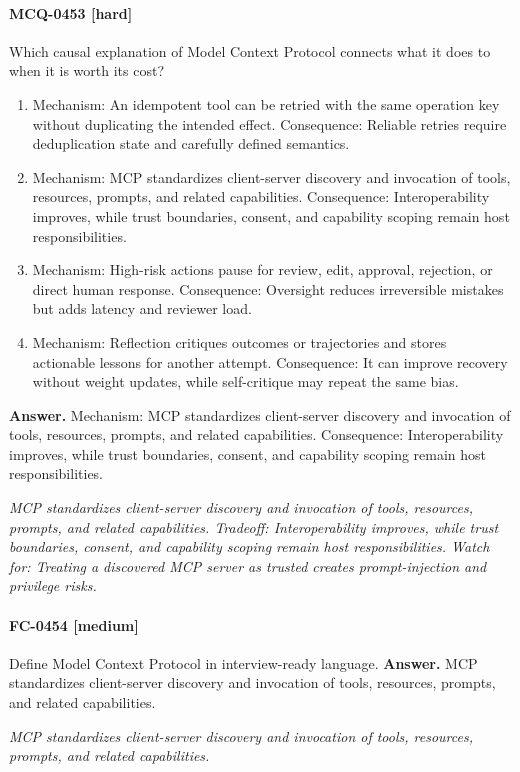 \paragraph{MCQ-0453 [hard]} Which causal explanation of Model Context Protocol connects what it does to when it is worth its cost?
\begin{enumerate}[label=\Alph*.]
\item Mechanism: An idempotent tool can be retried with the same operation key without duplicating the intended effect. Consequence: Reliable retries require deduplication state and carefully defined semantics.
\item Mechanism: MCP standardizes client-server discovery and invocation of tools, resources, prompts, and related capabilities. Consequence: Interoperability improves, while trust boundaries, consent, and capability scoping remain host responsibilities.
\item Mechanism: High-risk actions pause for review, edit, approval, rejection, or direct human response. Consequence: Oversight reduces irreversible mistakes but adds latency and reviewer load.
\item Mechanism: Reflection critiques outcomes or trajectories and stores actionable lessons for another attempt. Consequence: It can improve recovery without weight updates, while self-critique may repeat the same bias.
\end{enumerate}
\noindent\textbf{Answer.} Mechanism: MCP standardizes client-server discovery and invocation of tools, resources, prompts, and related capabilities. Consequence: Interoperability improves, while trust boundaries, consent, and capability scoping remain host responsibilities.
\par\textit{MCP standardizes client-server discovery and invocation of tools, resources, prompts, and related capabilities. Tradeoff: Interoperability improves, while trust boundaries, consent, and capability scoping remain host responsibilities. Watch for: Treating a discovered MCP server as trusted creates prompt-injection and privilege risks.}
\paragraph{FC-0454 [medium]} Define Model Context Protocol in interview-ready language.
\noindent\textbf{Answer.} MCP standardizes client-server discovery and invocation of tools, resources, prompts, and related capabilities.
\par\textit{MCP standardizes client-server discovery and invocation of tools, resources, prompts, and related capabilities.}
